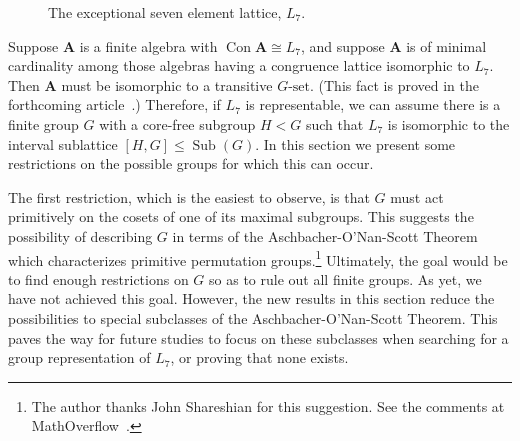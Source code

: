 \documentclass[11pt]{amsart}
\theoremstyle{plain}
\theoremstyle{definition}
\theoremstyle{remark}
\numberwithin{theorem}{section}
\numberwithin{claim}{section}
\numberwithin{equation}{section}
\numberwithin{conjecture}{section}
\newcommand{\<}{\ensuremath{\langle}}
\renewcommand{\>}{\ensuremath{\rangle}}
\renewcommand{\leq}{\ensuremath{\leqslant}}
\newcommand{\Con}{\ensuremath{\operatorname{Con}}}
\newcommand{\Sub}{\ensuremath{\operatorname{Sub}}}
\newcommand{\0}{\ensuremath{\mathbf{0}}}
\newcommand{\1}{\ensuremath{\mathbf{1}}}
\newcommand{\2}{\ensuremath{\mathbf{2}}}
\newcommand{\3}{\ensuremath{\mathbf{3}}}
\newcommand{\4}{\ensuremath{\mathbf{4}}}
\newcommand{\5}{\ensuremath{\mathbf{5}}}
\newcommand{\bA}{\ensuremath{\mathbf{A}}}
\newcommand{\Gset}{\ensuremath{G\text{-set}}}
\begin{document}
\begin{figure}[h!]
\begin{center}
  {
  }
\end{center}
  \caption{The exceptional seven element lattice, $L_7$.}
  \label{fig:L7}
\end{figure}

Suppose $\bA$ is a finite algebra with $\Con \bA \cong L_7$, and
suppose $\bA$ is of minimal cardinality among those algebras having
a congruence lattice isomorphic to $L_7$.  Then 
$\bA$ must be isomorphic to a transitive \Gset.
(This fact is proved in the forthcoming article~\cite{gsets}.)  
Therefore, if $L_7$ is representable, we can assume there is a finite group $G$ with a 
core-free
subgroup $H<G$ such that $L_7$ is isomorphic to the interval
sublattice $[H,G] \leq \Sub(G)$.  In this section we present some restrictions
on the possible groups for which this can occur.  

The first restriction, which is
the easiest to observe, is that $G$ must act primitively on the cosets of one of its
maximal subgroups.  This suggests the possibility of describing $G$ in terms of
the Aschbacher-O'Nan-Scott Theorem which characterizes primitive
permutation groups.\footnote{The author thanks John Shareshian for 
this suggestion. See the comments at MathOverflow~\cite{MO85724}.}
Ultimately, the goal would be to find enough
restrictions on $G$ so as to rule out all finite groups.  As yet, we have not
achieved this goal.  However, the new results in this section reduce the
possibilities to special subclasses of the Aschbacher-O'Nan-Scott
Theorem.  This paves the way for future studies to focus on these subclasses
when searching for a group representation of $L_7$, or proving that none exists.
\end{document}
